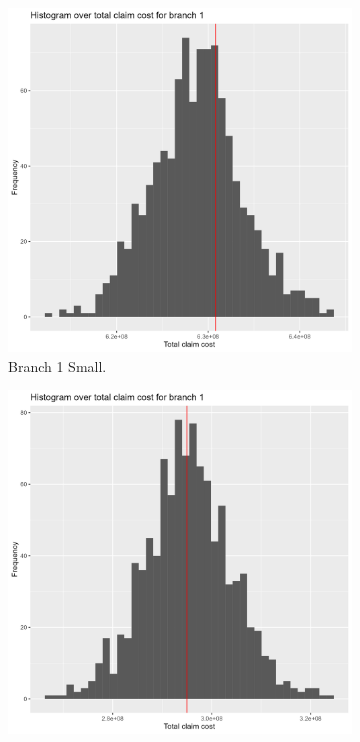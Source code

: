 \documentclass[11pt]{article}
\begin{document}
\begin{figure}[!h]
\centering
    \begin{subfigure}{.24\textwidth}
      \centering
      \includegraphics[width=.9\linewidth]{plots/simulation/histogram_total_claim_cost_small1.png}
      \caption{Branch 1 Small.}
    \end{subfigure}%
    \begin{subfigure}{.24\textwidth}
      \centering
      \includegraphics[width=.9\linewidth]{plots/simulation/histogram_total_claim_cost_large1.png}

\end{subfigure}
\end{figure}
\end{document}

